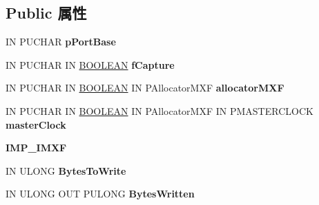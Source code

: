 \subsection*{Public 属性}
\begin{DoxyCompactItemize}
\item 
\mbox{\label{class_c_miniport_d_mus_u_a_r_t_stream_a0f67e3c6ed6e82ef54e082618879bb69}} 
IN P\+U\+C\+H\+AR {\bfseries p\+Port\+Base}
\item 
\mbox{\label{class_c_miniport_d_mus_u_a_r_t_stream_a5df36a5a76ef08386a3e500ca8beab34}} 
IN P\+U\+C\+H\+AR IN \hyperlink{_processor_bind_8h_a112e3146cb38b6ee95e64d85842e380a}{B\+O\+O\+L\+E\+AN} {\bfseries f\+Capture}
\item 
\mbox{\label{class_c_miniport_d_mus_u_a_r_t_stream_a886dc4854b4e4ddfb2b04a4e0afcc784}} 
IN P\+U\+C\+H\+AR IN \hyperlink{_processor_bind_8h_a112e3146cb38b6ee95e64d85842e380a}{B\+O\+O\+L\+E\+AN} IN P\+Allocator\+M\+XF {\bfseries allocator\+M\+XF}
\item 
\mbox{\label{class_c_miniport_d_mus_u_a_r_t_stream_a7c5b4be9ead0c0de5e279fab3433f49a}} 
IN P\+U\+C\+H\+AR IN \hyperlink{_processor_bind_8h_a112e3146cb38b6ee95e64d85842e380a}{B\+O\+O\+L\+E\+AN} IN P\+Allocator\+M\+XF IN P\+M\+A\+S\+T\+E\+R\+C\+L\+O\+CK {\bfseries master\+Clock}
\item 
\mbox{\label{class_c_miniport_d_mus_u_a_r_t_stream_a3f18e9be22aa3cb95028266c77be2521}} 
{\bfseries I\+M\+P\+\_\+\+I\+M\+XF}
\item 
\mbox{\label{class_c_miniport_d_mus_u_a_r_t_stream_a6070e3419441fea60a37ed4ce4da4b8e}} 
IN U\+L\+O\+NG {\bfseries Bytes\+To\+Write}
\item 
\mbox{\label{class_c_miniport_d_mus_u_a_r_t_stream_a468b696a12593b18d80532b2ea07efa5}} 
IN U\+L\+O\+NG O\+UT P\+U\+L\+O\+NG {\bfseries Bytes\+Written}
\end{DoxyCompactItemize}
